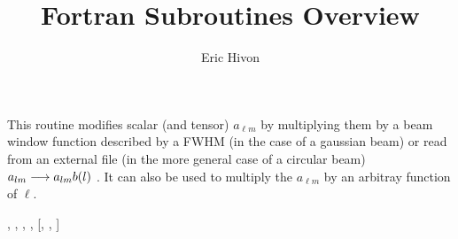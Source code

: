 
\sloppy


\title{\healpix Fortran Subroutines Overview}
 \section[alter\_alm*]{ }
\label{sub:alter_alm}
\author{Eric Hivon}

\begin{facility}
{This routine modifies scalar (and tensor) $a_{\ell m}$ by multiplying them by a beam window
  function described by a FWHM (in the case of a gaussian beam) or read from an external
  file (in the more general case of a circular beam)  $a_{l m}
  \longrightarrow a_{l m} b(l)$ . It can also be used to
  multiply the  $a_{\ell m}$ by an arbitray function of $\ell$.}
{\modAlmTools}
\end{facility}

\begin{f90format}
{%
, %
, %
, %
, %
 [, %
, %
]}
\end{f90format}

